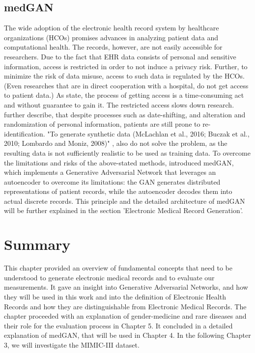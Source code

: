 \documentclass[11pt, a4paper, oneside]{book}
\begin{document}
\subsection{medGAN}
The wide adoption of the electronic health record system by healthcare organizations (HCOs) promises advances in analyzing patient data and computational health. The records, however, are not easily accessible for researchers. Due to the fact that EHR data consists of personal and sensitive information, access is restricted in order to not induce a privacy risk. Further, to minimize the risk of data misuse, access to such data is regulated by the HCOs. \citep{Choi2017}
(Even researches that are in direct cooperation with a hospital, do not get access to patient data.)
 As \citep{Choi2017} state, the process of getting access is a time-consuming act and without guarantee to gain it. The restricted access slows down research. \citep{Choi2017} further describe, that despite processes such as date-shifting, and alteration and randomization of personal information, patients are still prone to re-identification. "To generate synthetic data (McLachlan et al., 2016; Buczak et al., 2010; Lombardo and Moniz, 2008)" \citep{Choi2017}, also do not solve the problem, as the resulting data is not sufficiently realistic to be used as training data.
 To overcome the limitations and risks of the above-stated methods, \citep{Choi2017} introduced medGAN, which implements a Generative Adversarial Network that leverages an autoencoder to overcome its limitations: the GAN generates distributed representations of patient records, while the autoencoder decodes them into actual discrete records.
 This principle and the detailed architecture of medGAN will be further explained in the section 'Electronic Medical Record Generation'.

\section{Summary}
This chapter provided an overview of fundamental concepts that need to be understood to generate electronic medical records and to evaluate our measurements.
It gave an insight into Generative Adversarial Networks, and how they will be used in this work and into the definition of Electronic Health Records and how they are distinguishable from Electronic Medical Records.
The chapter proceeded with an explanation of gender-medicine and rare diseases and their role for the evaluation process in Chapter 5. It concluded in a detailed explanation of medGAN, that will be used in Chapter 4. In the following Chapter 3, we will investigate the MIMIC-III dataset.
\end{document}
